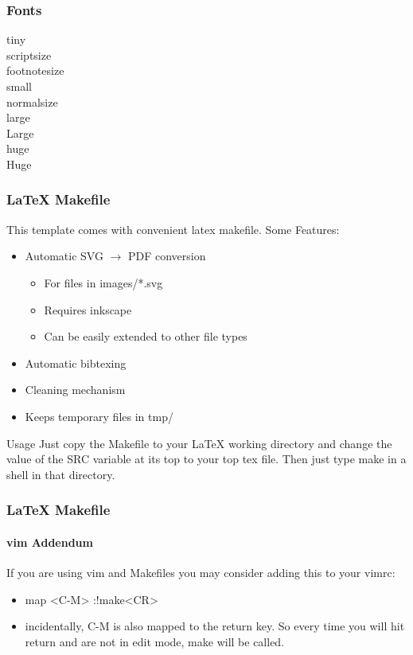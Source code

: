 \documentclass[10pt]{beamer}
\begin{document}
\begin{frame}
  \frametitle{Fonts}
  \tiny tiny\\
  \scriptsize scriptsize\\
  \footnotesize footnotesize\\
  \small small\\
  \normalsize normalsize\\
  \large large\\
  \Large Large \\
  \huge huge \\
  \Huge Huge\\
\end{frame}

\begin{frame}
  \layout
  \ugoeAddLogo
\end{frame}

\begin{frame}
  \frametitle{\LaTeX{} Makefile}
  This template comes with convenient latex makefile. Some Features:
  \begin{itemize}
    \item 
      Automatic SVG $\rightarrow$ PDF conversion
      \begin{itemize}
        \item 
          For files in images/*.svg
        \item
          Requires inkscape
        \item
          Can be easily extended to other file types
      \end{itemize}
    \item
      Automatic bibtexing
    \item
      Cleaning mechanism
    \item
      Keeps temporary files in tmp/
  \end{itemize}
  \begin{exampleblock}{Usage}
    Just copy the Makefile to your \LaTeX{} working directory and change
    the value of the SRC variable at its top to your top tex file. Then
    just type make in a shell in that directory.
  \end{exampleblock}
\end{frame}

\begin{frame}
  \frametitle{\LaTeX{} Makefile}
  \framesubtitle{vim Addendum}
  If you are using vim and Makefiles you may consider adding this to your 
  vimrc:
  \begin{itemize}
    \item 
      map <C-M> :!make<CR>
    \item
      incidentally, C-M is also mapped to the return key. So every time
      you will hit return and are not in edit mode, make will be called.
  \end{itemize}
\end{frame}
\end{document}
